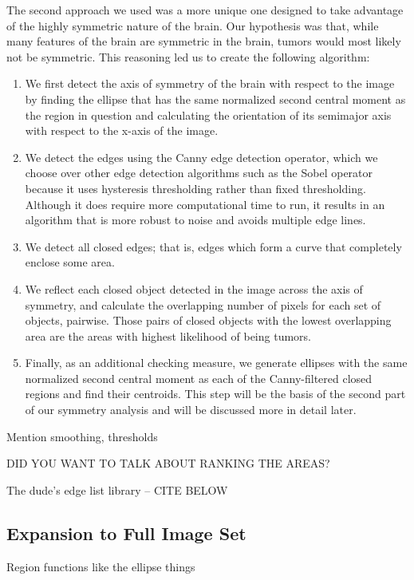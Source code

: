 \documentclass[12pt]{article}
\theoremstyle{plain}%
\theoremstyle{definition}
\theoremstyle{remark}
\begin{document}
The second approach we used was a more unique one designed to take advantage of the highly symmetric nature of the brain. Our hypothesis was that, while many features of the brain are symmetric in the brain, tumors would most likely not be symmetric. This reasoning led us to create the following algorithm:

\begin{enumerate}
\item We first detect the axis of symmetry of the brain with respect to the image by finding the ellipse that has the same normalized second central moment as the region in question and calculating the orientation of its semimajor axis with respect to the x-axis of the image.
\item We detect the edges using the Canny edge detection operator, which we choose over other edge detection algorithms such as the Sobel operator because it uses hysteresis thresholding rather than fixed thresholding. Although it does require more computational time to run, it results in an algorithm that is more robust to noise and avoids multiple edge lines.
\item We detect all closed edges; that is, edges which form a curve that completely enclose some area.
\item We reflect each closed object detected in the image across the axis of symmetry, and calculate the overlapping number of pixels for each set of objects, pairwise. Those pairs of closed objects with the lowest overlapping area are the areas with highest likelihood of being tumors.
\item Finally, as an additional checking measure, we generate ellipses with the same normalized second central moment as each of the Canny-filtered closed regions and find their centroids. This step will be the basis of the second part of our symmetry analysis and will be discussed more in detail later.
\end{enumerate}


Mention smoothing, thresholds

DID YOU WANT TO TALK ABOUT RANKING THE AREAS?

The dude’s edge list library – CITE BELOW

\subsection{Expansion to Full Image Set}

Region functions like the ellipse things
\end{document}
